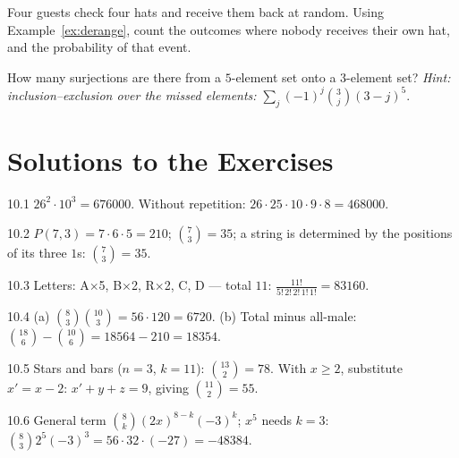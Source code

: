 \begin{exercise}{\hard}
Four guests check four hats and receive them back at random. Using
Example~\ref{ex:derange}, count the outcomes where nobody receives their own
hat, and the probability of that event.
\end{exercise}

\begin{exercise}{\hard}
How many surjections are there from a $5$-element set onto a $3$-element
set? \emph{Hint: inclusion--exclusion over the missed elements:}
$\sum_{j} (-1)^{j}\binom{3}{j}(3-j)^{5}$.
\end{exercise}

\section*{Solutions to the Exercises}

\begin{solution}{10.1}
$26^2 \cdot 10^3 = 676000$. Without repetition:
$26 \cdot 25 \cdot 10 \cdot 9 \cdot 8 = 468000$.
\end{solution}

\begin{solution}{10.2}
$P(7,3) = 7\cdot6\cdot5 = 210$; $\binom{7}{3} = 35$; a string is determined
by the positions of its three $1$s: $\binom{7}{3} = 35$.
\end{solution}

\begin{solution}{10.3}
Letters: A$\times$5, B$\times$2, R$\times$2, C, D --- total $11$:
$\frac{11!}{5!\,2!\,2!\,1!\,1!} = 83160$.
\end{solution}

\begin{solution}{10.4}
(a) $\binom{8}{3}\binom{10}{3} = 56 \cdot 120 = 6720$.
(b) Total minus all-male: $\binom{18}{6} - \binom{10}{6} = 18564 - 210 =
18354$.
\end{solution}

\begin{solution}{10.5}
Stars and bars ($n = 3$, $k = 11$): $\binom{13}{2} = 78$. With $x \geq 2$,
substitute $x' = x - 2$: $x' + y + z = 9$, giving $\binom{11}{2} = 55$.
\end{solution}

\begin{solution}{10.6}
General term $\binom{8}{k}(2x)^{8-k}(-3)^{k}$; $x^5$ needs $k = 3$:
$\binom{8}{3} 2^{5} (-3)^{3} = 56 \cdot 32 \cdot (-27) = -48384$.
\end{solution}

